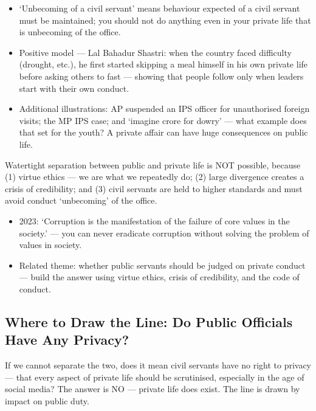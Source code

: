 \begin{itemize}
\item `Unbecoming of a civil servant' means behaviour expected of a civil servant must be maintained; you should not do anything even in your private life that is unbecoming of the office.
\item Positive model --- Lal Bahadur Shastri: when the country faced difficulty (drought, etc.), he first started skipping a meal himself in his own private life before asking others to fast --- showing that people follow only when leaders start with their own conduct.
\item Additional illustrations: AP suspended an IPS officer for unauthorised foreign visits; the MP IPS case; and `imagine  crore for dowry' --- what example does that set for the youth? A private affair can have huge consequences on public life.
\end{itemize}

\begin{KeyConcept}
Watertight separation between public and private life is NOT possible, because (1) virtue ethics --- we are what we repeatedly do; (2) large divergence creates a crisis of credibility; and (3) civil servants are held to higher standards and must avoid conduct `unbecoming' of the office.
\end{KeyConcept}

\begin{PYQLink}
\begin{itemize}
\item 2023: `Corruption is the manifestation of the failure of core values in the society.' --- you can never eradicate corruption without solving the problem of values in society.
\item Related theme: whether public servants should be judged on private conduct --- build the answer using virtue ethics, crisis of credibility, and the code of conduct.
\end{itemize}
\end{PYQLink}

\subsection{Where to Draw the Line: Do Public Officials Have Any Privacy?}

If we cannot separate the two, does it mean civil servants have no right to privacy --- that every aspect of private life should be scrutinised, especially in the age of social media? The answer is NO --- private life does exist. The line is drawn by impact on public duty.

